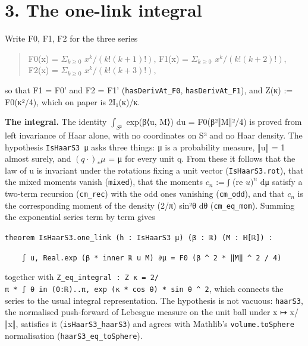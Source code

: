 \documentclass[11pt,a4paper]{article}
\theoremstyle{named}
\begin{document}
\section*{3. The one-link integral}
Write F0, F1, F2 for the three series

\begin{quote}
F0(x) = $Σ_{k≥0}$ $x^k/(k!(k+1)!)$,  F1(x) = $Σ_{k≥0}$ $x^k/(k!(k+2)!)$,  F2(x) = $Σ_{k≥0}$ $x^k/(k!(k+3)!)$,
\end{quote}
so that F1 = F0' and F2 = F1' (\texttt{hasDerivAt\_\allowbreak{}F0}, \texttt{hasDerivAt\_\allowbreak{}F1}), and Z(κ) := F0(κ²/4), which on paper is 2I₁(κ)/κ.

\textbf{The integral.} The identity $∫_{S³}$ exp(β⟨u, M⟩) du = F0(β²‖M‖²/4) is proved from left invariance of Haar alone, with no coordinates on S³ and no Haar density. The hypothesis \texttt{IsHaarS3\ \allowbreak{}μ} asks three things: μ is a probability measure, ‖u‖ = 1 almost surely, and $(q·)_*μ$ = μ for every unit q. From these it follows that the law of u is invariant under the rotations fixing a unit vector (\texttt{IsHaarS3.\allowbreak{}rot}), that the mixed moments vanish (\texttt{mixed}), that the moments $c_n$ := ∫ (re $u)^n$ dμ satisfy a two-term recursion (\texttt{cm\_\allowbreak{}rec}) with the odd ones vanishing (\texttt{cm\_\allowbreak{}odd}), and that $c_n$ is the corresponding moment of the density (2/π) sin²θ dθ (\texttt{cm\_\allowbreak{}eq\_\allowbreak{}mom}). Summing the exponential series term by term gives

\begin{leancode}
\item \texttt{theorem\ \allowbreak{}IsHaarS3.\allowbreak{}one\_\allowbreak{}link\ \allowbreak{}(h\ \allowbreak{}:\ \allowbreak{}IsHaarS3\ \allowbreak{}μ)\ \allowbreak{}(β\ \allowbreak{}:\ \allowbreak{}ℝ)\ \allowbreak{}(M\ \allowbreak{}:\ \allowbreak{}ℍ[ℝ])\ \allowbreak{}:}
\item \texttt{\ \allowbreak{}\ \allowbreak{}\ \allowbreak{}\ \allowbreak{}∫\ \allowbreak{}u,\ \allowbreak{}Real.\allowbreak{}exp\ \allowbreak{}(β\ \allowbreak{}*\ \allowbreak{}inner\ \allowbreak{}ℝ\ \allowbreak{}u\ \allowbreak{}M)\ \allowbreak{}∂μ\ \allowbreak{}=\ \allowbreak{}F0\ \allowbreak{}(β\ \allowbreak{}\textasciicircum{}\ \allowbreak{}2\ \allowbreak{}*\ \allowbreak{}‖M‖\ \allowbreak{}\textasciicircum{}\ \allowbreak{}2\ \allowbreak{}/\ \allowbreak{}4)}
\end{leancode}
together with \texttt{Z\_\allowbreak{}eq\_\allowbreak{}integral\ \allowbreak{}:\ \allowbreak{}Z\ \allowbreak{}κ\ \allowbreak{}=\ \allowbreak{}2/π\ \allowbreak{}*\ \allowbreak{}∫\ \allowbreak{}θ\ \allowbreak{}in\ \allowbreak{}(0:ℝ).\allowbreak{}.\allowbreak{}π,\ \allowbreak{}exp\ \allowbreak{}(κ\ \allowbreak{}*\ \allowbreak{}cos\ \allowbreak{}θ)\ \allowbreak{}*\ \allowbreak{}sin\ \allowbreak{}θ\ \allowbreak{}\textasciicircum{}\ \allowbreak{}2}, which connects the series to the usual integral representation. The hypothesis is not vacuous: \texttt{haarS3}, the normalised push-forward of Lebesgue measure on the unit ball under x ↦ x/‖x‖, satisfies it (\texttt{isHaarS3\_\allowbreak{}haarS3}) and agrees with Mathlib's \texttt{volume.\allowbreak{}toSphere} normalisation (\texttt{haarS3\_\allowbreak{}eq\_\allowbreak{}toSphere}).
\end{document}
